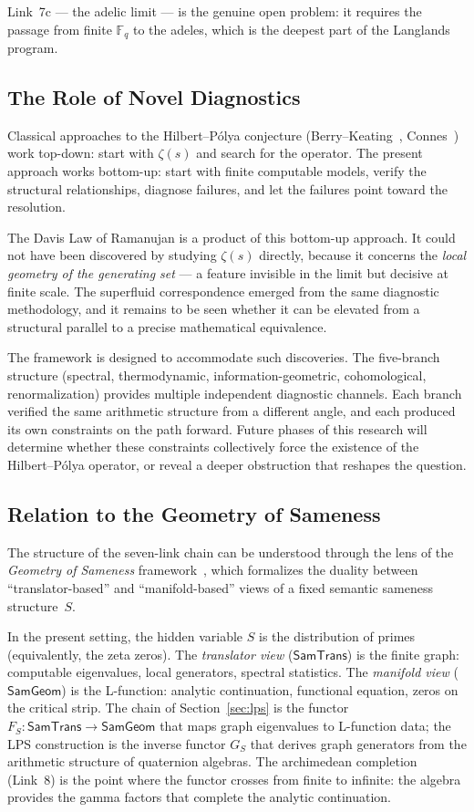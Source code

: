 \documentclass[12pt,reqno]{amsart}
\theoremstyle{plain}
\theoremstyle{definition}
\theoremstyle{remark}
\newcommand{\SamTrans}{\mathsf{SamTrans}}
\newcommand{\SamGeom}{\mathsf{SamGeom}}
\newcommand{\FF}{\mathbb{F}}
\begin{document}
Link~7c --- the adelic limit ---
is the genuine open problem:
it requires the passage from finite $\FF_q$ to the adeles, which is
the deepest part of the Langlands program.

\subsection{The Role of Novel Diagnostics}

Classical approaches to the Hilbert--P\'olya conjecture
(Berry--Keating~\cite{berry_keating1999},
Connes~\cite{connes1999}) work top-down: start with $\zeta(s)$
and search for the operator.  The present approach works bottom-up:
start with finite computable models, verify the structural
relationships, diagnose failures, and let the failures point toward
the resolution.

The Davis Law of Ramanujan is a product of this bottom-up approach.
It could not have been discovered by studying $\zeta(s)$ directly,
because it concerns the \emph{local geometry of the generating set}
--- a feature invisible in the limit but decisive at finite scale.
The superfluid correspondence emerged from the same diagnostic
methodology, and it remains to be seen whether it can be elevated
from a structural parallel to a precise mathematical equivalence.

The framework is designed to accommodate such discoveries.  The
five-branch structure (spectral, thermodynamic, information-geometric,
cohomological, renormalization) provides multiple independent
diagnostic channels.  Each branch verified the same arithmetic
structure from a different angle, and each produced its own
constraints on the path forward.  Future phases of this research will
determine whether these constraints collectively force the existence
of the Hilbert--P\'olya operator, or reveal a deeper obstruction that
reshapes the question.

\subsection{Relation to the Geometry of Sameness}

The structure of the seven-link chain can be understood through the
lens of the \emph{Geometry of Sameness} framework~\cite{davis2025sameness},
which formalizes the duality between ``translator-based'' and
``manifold-based'' views of a fixed semantic sameness structure~$S$.

In the present setting, the hidden variable $S$ is the distribution
of primes (equivalently, the zeta zeros).  The \emph{translator view}
($\SamTrans$) is the finite graph: computable eigenvalues, local
generators, spectral statistics.  The \emph{manifold view}
($\SamGeom$) is the L-function: analytic continuation, functional
equation, zeros on the critical strip.  The chain of
Section~\ref{sec:lps} is the functor $F_S : \SamTrans \to \SamGeom$
that maps graph eigenvalues to L-function data; the LPS construction
is the inverse functor $G_S$ that derives graph generators from the
arithmetic structure of quaternion algebras.  The archimedean
completion (Link~8) is the point where the functor crosses from finite
to infinite: the algebra provides the gamma factors that complete the
analytic continuation.
\end{document}
